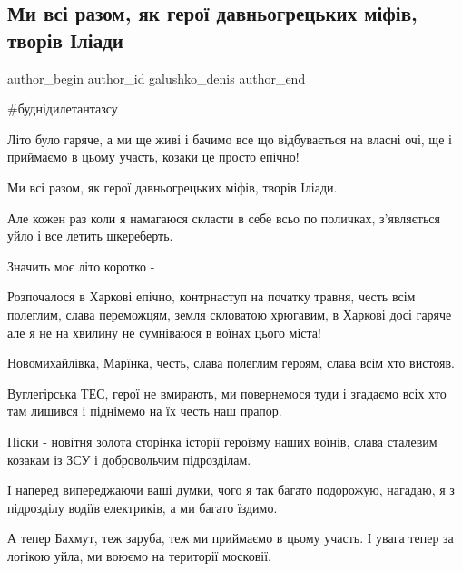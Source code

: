  
 
 
 
 

\subsection{Ми всі разом, як герої давньогрецьких міфів, творів Іліади}
\label{sec:30_09_2022.fb.galushko_denis.1.mi_vs__razom__yak_ge}

\ifcmt
 author_begin
   author_id galushko_denis
 author_end
\fi

\#буднідилетантазсу

Літо було гаряче, а ми ще живі і бачимо все що відбувається на власні очі, ще і
приймаємо в цьому участь, козаки це просто епічно! 

Ми всі разом, як герої давньогрецьких міфів, творів Іліади. 

Але кожен раз коли я намагаюся скласти в себе всьо по поличках, з’являється
уйло і все летить шкереберть.

Значить моє літо коротко - 

Розпочалося в Харкові епічно, контрнаступ на початку травня, честь всім
полеглим, слава переможцям, земля скловатою хрюгавим, в Харкові досі гаряче але
я не на хвилину не сумніваюся в воїнах цього міста!

Новомихайлівка, Марїнка, честь, слава полеглим героям, слава всім хто вистояв.      

Вуглегірська ТЕС, герої не вмирають, ми повернемося туди і згадаємо всіх хто
там лишився і піднімемо на їх честь наш прапор. 

Піски - новітня золота сторінка історії героїзму наших воїнів, слава
сталевим козакам із ЗСУ і добровольчим підрозділам. 

І наперед випереджаючи ваші думки, чого я так багато подорожую, нагадаю, я з
підрозділу водіїв електриків, а ми багато їздимо. 

А тепер Бахмут, теж заруба, теж ми приймаємо в цьому участь. І увага тепер за
логікою уйла, ми воюємо на території московії.

